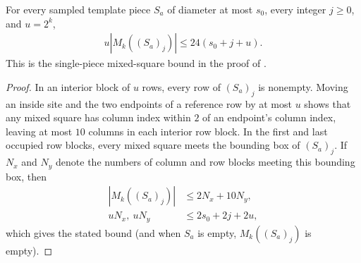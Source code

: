 \begin{lemma}
    \label{thm:area_law_template_piece_mixed_count}
    \leanok
    For every sampled template piece $S_a$ of diameter at most $s_0$,
    every integer $j\ge0$, and $u=2^k$,
    \begin{align}
        u|M_k((S_a)_j)|\le24(s_0+j+u).
    \end{align}
    This is the single-piece mixed-square bound in the proof of
    \cite[Lemma~9.4]{OpenAI2026AreaLaw}.
\end{lemma}
\begin{proof}\leanok
    In an interior block of $u$ rows, every row of $(S_a)_j$ is nonempty.
    Moving an inside site and the two endpoints of a reference row by at most $u$
    shows that any mixed square has column index within $2$ of an endpoint's
    column index, leaving at most $10$ columns in each interior row block.
    In the first and last occupied row blocks, every mixed square meets the
    bounding box of $(S_a)_j$. If $N_x$ and $N_y$ denote the numbers of column
    and row blocks meeting this bounding box, then
    \begin{align}
        |M_k((S_a)_j)| & \le2N_x+10N_y, \\
        uN_x,\ uN_y    & \le2s_0+2j+2u,
    \end{align}
    which gives the stated bound (and when $S_a$ is empty, $M_k((S_a)_j)$ is
    empty).
\end{proof}

